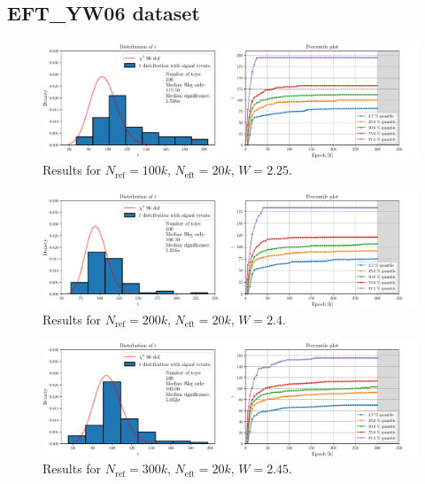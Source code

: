 \subsection*{EFT\_YW06 dataset}
\vspace{-5mm}
\begin{figure}[H]
	\centering
	\includegraphics[width=1.0\textwidth]{Python/RESULTS/ref100000_bkg0_eft20000/data_ref100000_bkg0_eft20000_wclip2-25.pdf}
	\caption{Results for $N_\mathrm{ref}=100\si{k}$, $N_\mathrm{eft}=20\si{k}$, $W=2.25$.}
	\label{fig:REF100000_BKG0_EFT20000_WCLIP2.25}
\end{figure}
\vspace{-5mm}
\begin{figure}[H]
	\centering
	\includegraphics[width=1.0\textwidth]{Python/RESULTS/ref200000_bkg0_eft20000/data_ref200000_bkg0_eft20000_wclip2-4.pdf}
	\caption{Results for $N_\mathrm{ref}=200\si{k}$, $N_\mathrm{eft}=20\si{k}$, $W=2.4$.}
	\label{fig:REF200000_BKG0_EFT20000_WCLIP2.4}
\end{figure}
\vspace{-5mm}
\begin{figure}[H]
	\centering
	\includegraphics[width=1.0\textwidth]{Python/RESULTS/ref300000_bkg0_eft20000/data_ref300000_bkg0_eft20000_wclip2-45.pdf}
	\caption{Results for $N_\mathrm{ref}=300\si{k}$, $N_\mathrm{eft}=20\si{k}$, $W=2.45$.}
	\label{fig:REF300000_BKG0_EFT20000_WCLIP2.45}
\end{figure}
